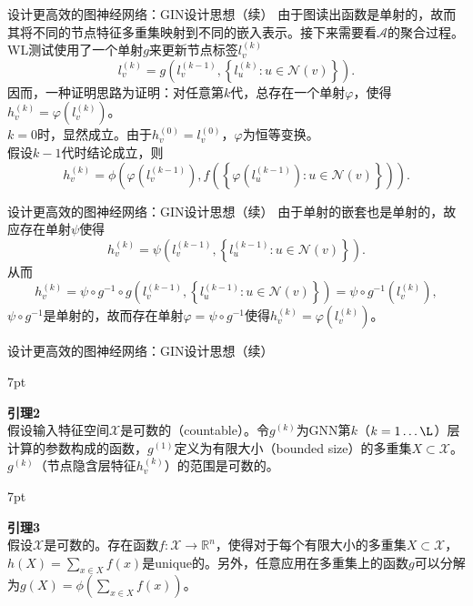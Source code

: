 \documentclass{beamer}
\newenvironment{formal}{%
	\def\FrameCommand{%
		\hspace{1pt}%
		{\color{deepgreen}\vrule width 2pt}%
		{\color{greenshade}\vrule width 4pt}%
		\colorbox{greenshade}%
	}%
	\MakeFramed{\advance\hsize-\width\FrameRestore}%
	\noindent\hspace{-4.55pt}%
	\begin{adjustwidth}{}{7pt}%
		\vspace{2pt}\vspace{2pt}%
	}
	{%
		\vspace{2pt}
	\end{adjustwidth}\endMakeFramed%
}
\begin{document}
\begin{frame}{设计更高效的图神经网络：GIN设计思想（续）}
	由于图读出函数是单射的，故而其将不同的节点特征多重集映射到不同的嵌入表示。接下来需要看$\mathcal{A}$的聚合过程。\\
	WL测试使用了一个单射$g$来更新节点标签$l_v^{\left(k\right)}$
	\begin{equation}
		l_v^{\left(k\right)}=g\left(l_v^{\left(k-1\right)},\left\{l_u^{\left(k\right)}:u\in\mathcal{N}\left(v\right)\right\}\right).
	\end{equation}
	因而，一种证明思路为证明：{\color{red}对任意第$k$代，总存在一个单射$\varphi$，使得$h_v^{\left(k\right)}=\varphi\left(l_v^{\left(k\right)}\right)$}。\\
	$k=0$时，显然成立。由于$h_v^{\left(0\right)}=l_v^{\left(0\right)}$，$\varphi$为恒等变换。\\
	假设$k-1$代时结论成立，则
	\begin{equation}
		h_v^{\left(k\right)}=\phi\left(\varphi\left(l_v^{\left(k-1\right)}\right),f\left(\left\{\varphi\left(l_u^{\left(k-1\right)}\right):u\in\mathcal{N}\left(v\right)\right\}\right)\right).
	\end{equation}
\end{frame}

\begin{frame}{设计更高效的图神经网络：GIN设计思想（续）}
	由于单射的嵌套也是单射的，故应存在单射$\psi$使得
	\begin{equation}
		h_v^{\left(k\right)}=\psi\left(l_v^{\left(k-1\right)},\left\{l_u^{\left(k-1\right)}:u\in\mathcal{N}\left(v\right)\right\}\right).
	\end{equation}
	从而
	\begin{equation}
		h_v^{\left(k\right)}=\psi\circ g^{-1}\circ g\left(l_v^{\left(k-1\right)},\left\{l_u^{\left(k-1\right)}:u\in\mathcal{N}\left(v\right)\right\}\right)=\psi\circ g^{-1}\left(l_v^{\left(k\right)}\right),
	\end{equation}
	$\psi\circ g^{-1}$是单射的，故而存在单射$\varphi=\psi\circ g^{-1}$使得$h_v^{\left(k\right)}=\varphi\left(l_v^{\left(k\right)}\right)$。
\end{frame}

\begin{frame}{设计更高效的图神经网络：GIN设计思想（续）}
	\begin{formal}
		\textbf{引理2}\\
		假设输入特征空间$\mathcal{X}$是可数的（countable）。令$g^{\left(k\right)}$为GNN第$k$（$k=1\dots\L$）层计算的参数构成的函数，$g^{\left(1\right)}$定义为有限大小（bounded size）的多重集$X\subset\mathcal{X}$。$g^{\left(k\right)}$（节点隐含层特征$h_v^{\left(k\right)}$）的范围是可数的。
	\end{formal}
	\begin{formal}
		\textbf{引理3}\\
		假设$\mathcal{X}$是可数的。存在函数$f:\mathcal{X}\to\mathbb{R}^n$，使得对于每个有限大小的多重集$X\subset\mathcal{X}$，$h\left(X\right)=\sum\limits_{x\in X}f\left(x\right)$是unique的。另外，任意应用在多重集上的函数$g$可以分解为$g\left(X\right)=\phi\left(\sum\limits_{x\in X}f\left(x\right)\right)$。
	\end{formal}
\end{frame}
\end{document}
